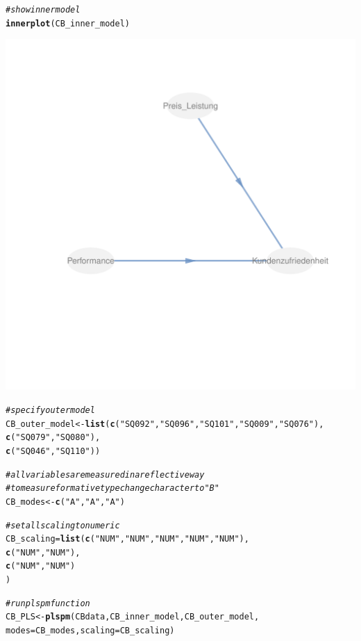 \documentclass{article}\usepackage[]{graphicx}\usepackage[]{color}
\makeatletter
\def\maxwidth{ %
  \ifdim\Gin@nat@width>\linewidth
    \linewidth
  \else
    \Gin@nat@width
  \fi
}
\newcommand{\hlstr}[1]{\textcolor[rgb]{0.192,0.494,0.8}{#1}}%
\newcommand{\hlcom}[1]{\textcolor[rgb]{0.678,0.584,0.686}{\textit{#1}}}%
\newcommand{\hlstd}[1]{\textcolor[rgb]{0.345,0.345,0.345}{#1}}%
\newcommand{\hlkwb}[1]{\textcolor[rgb]{0.69,0.353,0.396}{#1}}%
\newcommand{\hlkwc}[1]{\textcolor[rgb]{0.333,0.667,0.333}{#1}}%
\newcommand{\hlkwd}[1]{\textcolor[rgb]{0.737,0.353,0.396}{\textbf{#1}}}%
\newenvironment{kframe}{%
 \def\at@end@of@kframe{}%
 \ifinner\ifhmode%
  \def\at@end@of@kframe{\end{minipage}}%
  \begin{minipage}{\columnwidth}%
 \fi\fi%
 \def\FrameCommand##1{\hskip\@totalleftmargin \hskip-\fboxsep
 \colorbox{shadecolor}{##1}\hskip-\fboxsep
     \hskip-\linewidth \hskip-\@totalleftmargin \hskip\columnwidth}%
 \MakeFramed {\advance\hsize-\width
   \@totalleftmargin\z@ \linewidth\hsize
   \@setminipage}}%
 {\par\unskip\endMakeFramed%
 \at@end@of@kframe}
\newenvironment{knitrout}{}{} %
\makeatother
\begin{document}
\begin{knitrout}
\begin{kframe}
\begin{alltt}
\hlcom{#show inner model}
\hlkwd{innerplot}\hlstd{(CB_inner_model)}
\end{alltt}
\end{kframe}
\includegraphics[width=\maxwidth]{figure/plspm-1} 
\begin{kframe}\begin{alltt}
\hlcom{#specify outer model}
\hlstd{CB_outer_model} \hlkwb{<-} \hlkwd{list}\hlstd{(}\hlkwd{c}\hlstd{(}\hlstr{"SQ092"}\hlstd{,}\hlstr{"SQ096"}\hlstd{,}\hlstr{"SQ101"}\hlstd{,}\hlstr{"SQ009"}\hlstd{,}\hlstr{"SQ076"}\hlstd{),}
                       \hlkwd{c}\hlstd{(}\hlstr{"SQ079"}\hlstd{,}\hlstr{"SQ080"}\hlstd{),}
                       \hlkwd{c}\hlstd{(}\hlstr{"SQ046"}\hlstd{,}\hlstr{"SQ110"}\hlstd{))}

\hlcom{#all variables are measured in a reflective way}
\hlcom{#to measure formative type change character to "B"}
\hlstd{CB_modes} \hlkwb{<-} \hlkwd{c}\hlstd{(}\hlstr{"A"}\hlstd{,}\hlstr{"A"}\hlstd{,}\hlstr{"A"}\hlstd{)}

\hlcom{#set all scaling to numeric}
\hlstd{CB_scaling} \hlkwb{=} \hlkwd{list}\hlstd{(}\hlkwd{c}\hlstd{(}\hlstr{"NUM"}\hlstd{,} \hlstr{"NUM"}\hlstd{,}\hlstr{"NUM"}\hlstd{,} \hlstr{"NUM"}\hlstd{,} \hlstr{"NUM"}\hlstd{),}
                  \hlkwd{c}\hlstd{(}\hlstr{"NUM"}\hlstd{,} \hlstr{"NUM"}\hlstd{),}
                  \hlkwd{c}\hlstd{(}\hlstr{"NUM"}\hlstd{,} \hlstr{"NUM"}\hlstd{)}
\hlstd{)}

\hlcom{#run plspm function}
\hlstd{CB_PLS} \hlkwb{<-} \hlkwd{plspm}\hlstd{(CBdata,CB_inner_model,CB_outer_model,}
                \hlkwc{modes} \hlstd{= CB_modes,} \hlkwc{scaling} \hlstd{= CB_scaling)}
\end{alltt}


{\ttfamily\noindent\bfseries\color{errorcolor}{\#\# Error in if (convergence < specs\$tol | iter > specs\$maxiter) break: Fehlender Wert, wo TRUE/FALSE nötig ist}}\end{kframe}
\end{knitrout}
\end{document}

